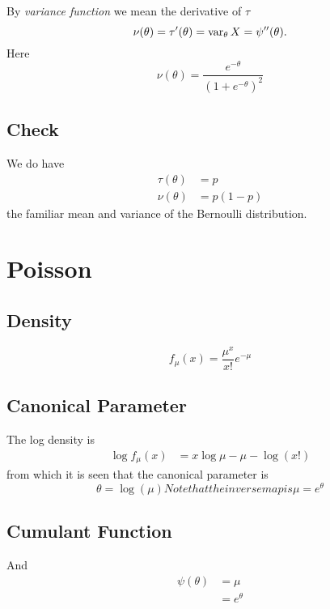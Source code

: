 By \emph{variance function} we mean the derivative of $\tau$
$$
   \nu(\theta) = \tau'(\theta) = \operatorname{var}_\theta X = \psi''(\theta).
$$
Here
$$
   \nu(\theta) = \frac{e^{- \theta}}{(1 + e^{- \theta})^2}
$$

\subsection{Check}

We do have
\begin{align*}
   \tau(\theta) & = p
   \\
   \nu(\theta) & = p (1 - p)
\end{align*}
the familiar mean and variance of the Bernoulli distribution.

\section{Poisson}

\subsection{Density}

$$
   f_\mu(x) = \frac{\mu^x}{x !} e^{- \mu}
$$

\subsection{Canonical Parameter}

The log density is
\begin{align*}
   \log f_\mu(x)
   & =
   x \log \mu - \mu - \log (x !)
\end{align*}
from which it is seen that the canonical parameter is
\begin{subequations}
\begin{equation} \label{eq:fred}
   \theta = \log(\mu)
\end{equation}
Note that the inverse map is
\begin{equation} \label{eq:fred-inv}
   \mu = e^\theta
\end{equation}
\end{subequations}

\subsection{Cumulant Function}

And
\begin{align*}
   \psi(\theta)
   & =
   \mu
   \\
   & =
   e^\theta
\end{align*}

